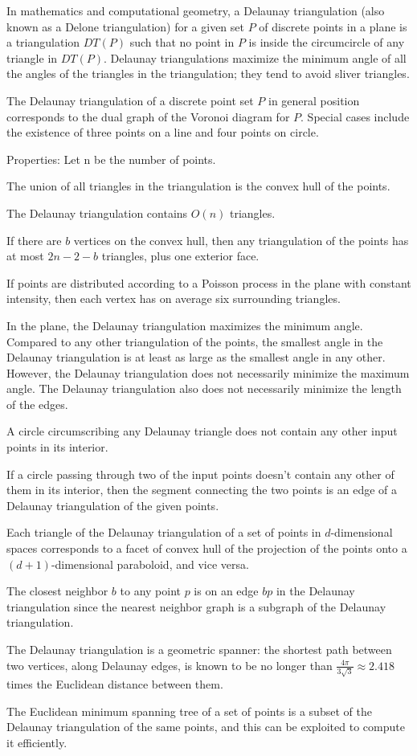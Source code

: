 In mathematics and computational geometry, a Delaunay triangulation (also known as a Delone triangulation) for a given set $P$ of discrete points in a plane is a triangulation $DT(P)$ such that no point in $P$ is inside the circumcircle of any triangle in $DT(P)$. Delaunay triangulations maximize the minimum angle of all the angles of the triangles in the triangulation; they tend to avoid sliver triangles.

The Delaunay triangulation of a discrete point set $P$ in general position corresponds to the dual graph of the Voronoi diagram for $P$. Special cases include the existence of three points on a line and four points on circle.

Properties: Let n be the number of points.
\begin{compactenum}
\item The union of all triangles in the triangulation is the convex hull of the points.
\item The Delaunay triangulation contains $O(n)$ triangles.
\item If there are $b$ vertices on the convex hull, then any triangulation of the points has at most $2n-2-b$ triangles, plus one exterior face.
\item If points are distributed according to a Poisson process in the plane with constant intensity, then each vertex has on average six surrounding triangles.
\item In the plane, the Delaunay triangulation maximizes the minimum angle. Compared to any other triangulation of the points, the smallest angle in the Delaunay triangulation is at least as large as the smallest angle in any other. However, the Delaunay triangulation does not necessarily minimize the maximum angle. The Delaunay triangulation also does not necessarily minimize the length of the edges.
\item A circle circumscribing any Delaunay triangle does not contain any other input points in its interior.
\item If a circle passing through two of the input points doesn't contain any other of them in its interior, then the segment connecting the two points is an edge of a Delaunay triangulation of the given points.
\item Each triangle of the Delaunay triangulation of a set of points in $d$-dimensional spaces corresponds to a facet of convex hull of the projection of the points onto a $(d+1)$-dimensional paraboloid, and vice versa.
\item The closest neighbor $b$ to any point $p$ is on an edge $bp$ in the Delaunay triangulation since the nearest neighbor graph is a subgraph of the Delaunay triangulation.
\item The Delaunay triangulation is a geometric spanner: the shortest path between two vertices, along Delaunay edges, is known to be no longer than ${\frac {4\pi }{3{\sqrt {3}}}}\approx 2.418$ times the Euclidean distance between them.
\item The Euclidean minimum spanning tree of a set of points is a subset of the Delaunay triangulation of the same points, and this can be exploited to compute it efficiently.
\end{compactenum}

